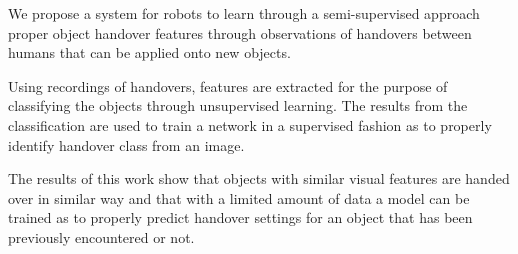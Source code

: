 We propose a system for robots to learn through a semi-supervised approach proper object handover features through observations of handovers between humans that can be applied onto new objects.

Using recordings of handovers, features are extracted for the purpose of classifying the objects through unsupervised learning. The results from the classification are used to train a network in a supervised fashion as to properly identify handover class from an image.

The results of this work show that objects with similar visual features are handed over in similar way and that with a limited amount of data a model can be trained as to properly predict handover settings for an object that has been previously encountered or not.
